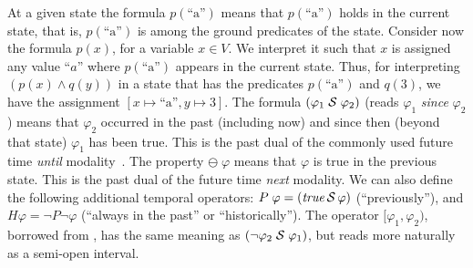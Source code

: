 \iffalse
At a given state the formula
$p(\text{``a''})$ means that $p (\text{``a''} )$ holds
in the current state,
that is, $p (\text{``a''} )$ is among 
the ground predicates of the state.
Consider now the formula $p ( x )$, for a variable $x \in V$.
We interpret it such that $x$ is assigned any value ``$a$'' where
$p ( \text{``a''} )$ appears in the current state. 
Thus, for interpreting $(p ( x ) \wedge q ( y ))$ in a state that
has the predicates
$p ( \text{``a''} )$ and $q ( 3 )$,
we have the assignment $[ x \mapsto \text{``a''} , y \mapsto 3 ]$.
The formula $(\varphi_1\; {\cal S}\; \varphi_2)$ 
(reads $\varphi_1$ {\em since} $\varphi_2$)
means that $\varphi_2$ occurred in the past (including now)
and since then (beyond that state) $\varphi_1$ has been true. This is the 
past dual of the commonly used %
future time  {\em until} modality~\cite{MP}. 
The property $\ominus \; \varphi$ means that $\varphi$ is true 
in the previous state.
This is the past dual of the %
future time {\em next} modality.
We can also define the following additional temporal operators:
$P \; \varphi = (\mathit{true} \, {\cal S} \, \varphi)$ (``previously''),
and $H \varphi = \neg P \neg \varphi$ (``always in the past'' or ``historically'').
The operator $[\varphi_1,\varphi_2)$, borrowed from \cite{MaC}, 
has the same meaning as $(\neg \varphi_2\; {\cal S}\; \varphi_1)$, but reads more naturally as
a semi-open interval. 



%
%
%

